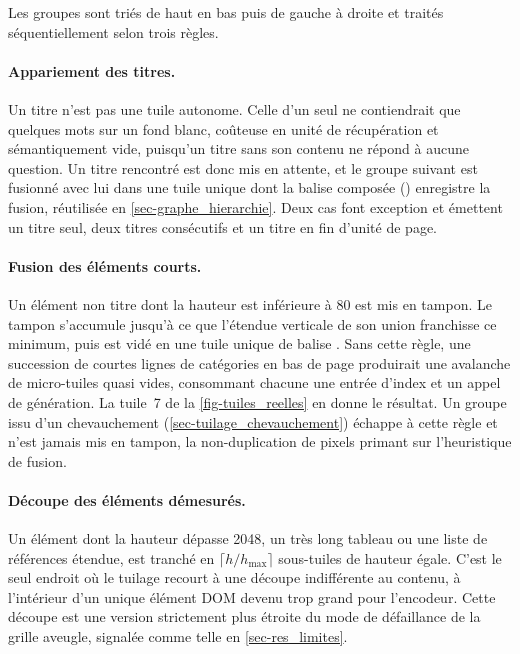 Les groupes sont triés de haut en bas puis de gauche à droite et traités
séquentiellement selon trois règles.

\paragraph{Appariement des titres.} Un titre n'est pas une tuile autonome.
Celle d'un  seul ne contiendrait que quelques mots sur un fond
blanc, coûteuse en unité de récupération et sémantiquement vide, puisqu'un
titre sans son contenu ne répond à aucune question. Un titre rencontré est donc
mis en attente, et le groupe suivant est fusionné avec lui dans une tuile
unique dont la balise composée () enregistre la fusion, réutilisée
en \cref{sec-graphe_hierarchie}. Deux cas font exception et émettent un titre
seul, deux titres consécutifs et un titre en fin d'unité de page.

\paragraph{Fusion des éléments courts.} Un élément non titre dont la hauteur
est inférieure à \SI{80}{\pixel} est mis en tampon. Le tampon s'accumule
jusqu'à ce que l'étendue verticale de son union franchisse ce minimum, puis est
vidé en une tuile unique de balise . Sans cette règle, une
succession de courtes lignes de catégories en bas de page produirait une
avalanche de micro-tuiles quasi vides, consommant chacune une entrée d'index et
un appel de génération. La tuile~7 de la \cref{fig-tuiles_reelles} en donne le
résultat. Un groupe issu d'un chevauchement
(\cref{sec-tuilage_chevauchement}) échappe à cette règle et n'est jamais mis en
tampon, la non-duplication de pixels primant sur l'heuristique de fusion.

\paragraph{Découpe des éléments démesurés.} Un élément dont la hauteur dépasse
\SI{2048}{\pixel}, un très long tableau ou une liste de références étendue, est
tranché en $\lceil h / h_{\max} \rceil$ sous-tuiles de hauteur égale. C'est le
seul endroit où le tuilage recourt à une découpe indifférente au contenu, à
l'intérieur d'un unique élément DOM devenu trop grand pour l'encodeur. Cette
découpe est une version strictement plus étroite du mode de défaillance de la
grille aveugle, signalée comme telle en \cref{sec-res_limites}.

